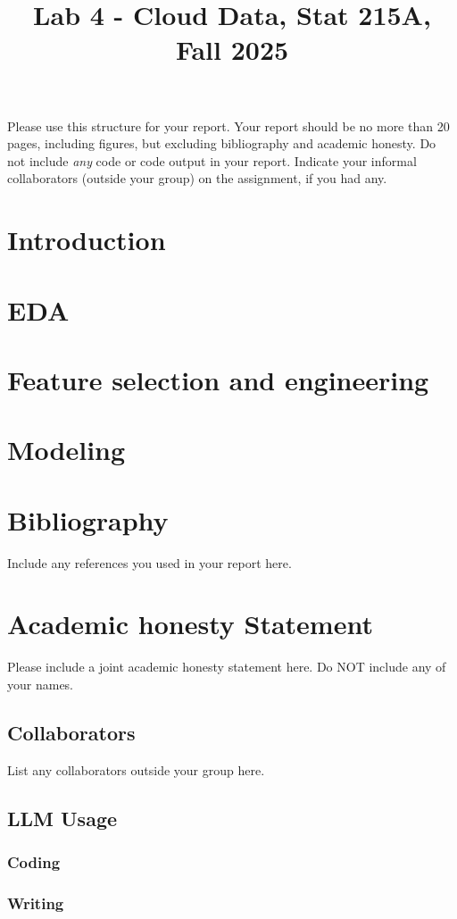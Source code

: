 \documentclass[10pt,letterpaper]{article}
\title{Lab 4 - Cloud Data, Stat 215A, Fall 2025\vspace{-2em}}
\begin{document}
\maketitle

Please use this structure for your report. Your report should be no more than 20 pages, including figures, but excluding bibliography and academic honesty. Do not include \emph{any} code or code output in your report. Indicate your informal collaborators (outside your group) on the assignment, if you had any.

\section{Introduction}

\section{EDA}

\section{Feature selection and engineering}


\section{Modeling}

\section{Bibliography}
Include any references you used in your report here.
\appendix
\section{Academic honesty Statement}
Please include a joint academic honesty statement here. Do NOT include any of your names.
\subsection{Collaborators}
List any collaborators outside your group here.
\subsection{LLM Usage}

\subsubsection*{Coding}

\subsubsection*{Writing}
\end{document}
